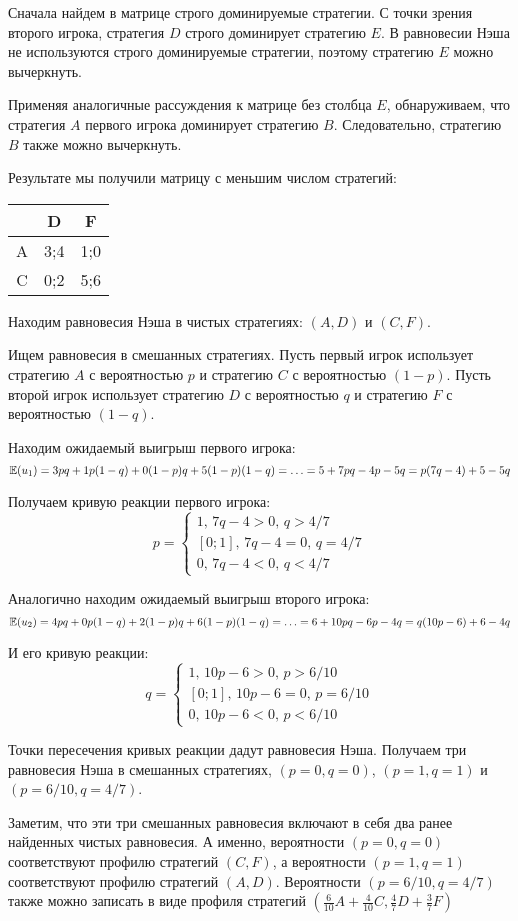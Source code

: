 \begin{solution}
Сначала найдем в матрице строго доминируемые стратегии. С точки зрения второго игрока, стратегия $D$ строго доминирует стратегию $E$. В равновесии Нэша не используются строго доминируемые стратегии, поэтому стратегию $E$ можно вычеркнуть.

Применяя аналогичные рассуждения к матрице без столбца $E$, обнаруживаем, что стратегия $A$ первого игрока доминирует стратегию $B$. Следовательно, стратегию $B$ также можно вычеркнуть.

Результате мы получили матрицу с меньшим числом стратегий:

\begin{tabular}{c|cc}
 & D &  F \\ 
\hline 
A & 3;4 &  1;0  \\ 
C & 0;2 &  5;6  \\ 
\end{tabular} 

Находим равновесия Нэша в чистых стратегиях: $(A,D)$ и $(C,F)$.

Ищем равновесия в смешанных стратегиях. Пусть первый игрок использует стратегию $A$ с вероятностью $p$ и стратегию $C$ с вероятностью $(1-p)$. Пусть второй игрок использует стратегию $D$ с вероятностью $q$ и стратегию $F$ с вероятностью $(1-q)$.

Находим ожидаемый выигрыш первого игрока:
\[
\mathbb{E}(u_1)=3pq+1p(1-q)+0(1-p)q+5(1-p)(1-q)=\ldots=5+7pq-4p-5q=p(7q-4)+5-5q
\]

Получаем кривую реакции первого игрока:
\[
p=
\begin{cases}
1, \, 7q-4>0, \, q>4/7 \\
[0;1], \, 7q-4=0, \, q=4/7 \\
0, \, 7q-4<0, \, q<4/7
\end{cases}
\]


Аналогично находим ожидаемый выигрыш второго игрока:
\[
\mathbb{E}(u_2)=4pq+0p(1-q)+2(1-p)q+6(1-p)(1-q)=\ldots=6+10pq-6p-4q=q(10p-6)+6-4q
\]

И его кривую реакции:
\[
q=
\begin{cases}
1, \, 10p-6>0, \, p>6/10 \\
[0;1], \, 10p-6=0, \, p=6/10 \\
0, \, 10p-6<0, \, p<6/10
\end{cases}
\]

Точки пересечения кривых реакции дадут равновесия Нэша. Получаем три равновесия Нэша в смешанных стратегиях, $(p=0, q=0)$, $(p=1,q=1)$  и $(p=6/10,q=4/7)$.

Заметим, что эти  три  смешанных равновесия включают в себя два ранее найденных чистых равновесия. А именно, вероятности $(p=0,q=0)$ соответствуют профилю стратегий  $(C,F)$, а вероятности $(p=1,q=1)$ соответствуют профилю стратегий  $(A,D)$. Вероятности $(p=6/10,q=4/7)$ также можно записать в виде профиля стратегий $(\frac{6}{10}A+\frac{4}{10}C,\frac{4}{7}D+\frac{3}{7}F)$
\end{solution}

